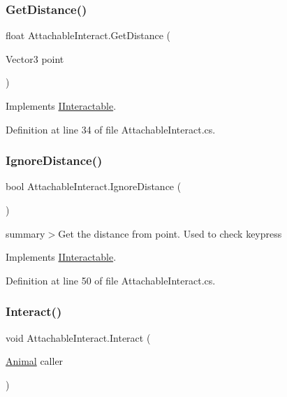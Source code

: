 \subsubsection{\texorpdfstring{Get\+Distance()}{GetDistance()}}
{\footnotesize\ttfamily float Attachable\+Interact.\+Get\+Distance (\begin{DoxyParamCaption}\item[{Vector3}]{point }\end{DoxyParamCaption})}



Implements \mbox{\hyperlink{interface_i_interactable_acde3047364ffe9a4ed107513feb21675}{I\+Interactable}}.



Definition at line 34 of file Attachable\+Interact.\+cs.

\mbox{\label{class_attachable_interact_a2778c59435948c3a3794664ceadc0c7f}} 
\subsubsection{\texorpdfstring{Ignore\+Distance()}{IgnoreDistance()}}
{\footnotesize\ttfamily bool Attachable\+Interact.\+Ignore\+Distance (\begin{DoxyParamCaption}{ }\end{DoxyParamCaption})}



summary$>$Get the distance from point. Used to check keypress



Implements \mbox{\hyperlink{interface_i_interactable_ad184024a0cc6bce38ebcd77c0126fcc5}{I\+Interactable}}.



Definition at line 50 of file Attachable\+Interact.\+cs.

\mbox{\label{class_attachable_interact_a3ce9d2122b8b014f608ed3ed1004f909}} 
\subsubsection{\texorpdfstring{Interact()}{Interact()}}
{\footnotesize\ttfamily void Attachable\+Interact.\+Interact (\begin{DoxyParamCaption}\item[{\mbox{\hyperlink{class_animal}{Animal}}}]{caller }\end{DoxyParamCaption})}




